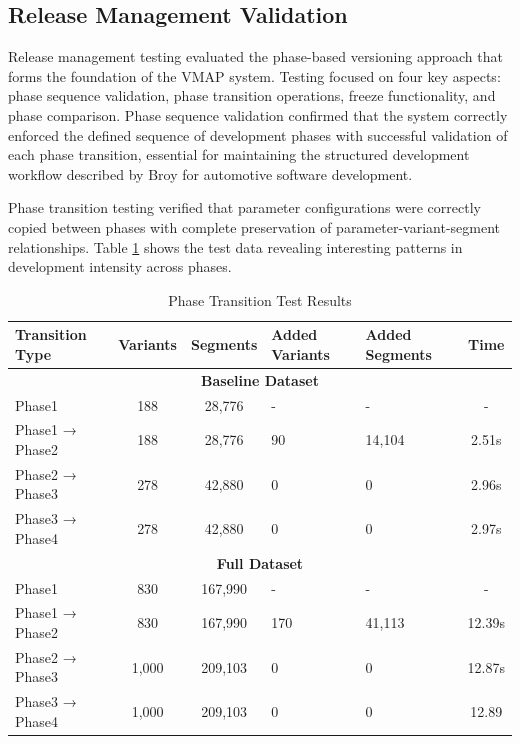 \subsection{Release Management Validation}
\label{subsec:release-management-validation}

Release management testing evaluated the phase-based versioning approach that forms the foundation of the \ac{VMAP} system. Testing focused on four key aspects: phase sequence validation, phase transition operations, freeze functionality, and phase comparison. Phase sequence validation confirmed that the system correctly enforced the defined sequence of development phases with successful validation of each phase transition, essential for maintaining the structured development workflow described by Broy \cite{broy2006challenges} for automotive software development.

Phase transition testing verified that parameter configurations were correctly copied between phases with complete preservation of parameter-variant-segment relationships. Table \ref{tab:phase-transition-results} shows the test data revealing interesting patterns in development intensity across phases.

\begin{table}[h]
\centering
\caption{Phase Transition Test Results}
\label{tab:phase-transition-results}
\begin{tabular}{|l|c|c|p{2cm}|p{2cm}|c|}
\hline
\textbf{Transition Type} & \textbf{Variants} & \textbf{Segments} & \textbf{Added Variants} & \textbf{Added Segments} & \textbf{Time} \\
\hline
\multicolumn{6}{|c|}{\textbf{Baseline Dataset}} \\
\hline
Phase1 & 188 & 28,776 & - & - & - \\
\hline
Phase1 → Phase2 & 188 & 28,776 & 90 & 14,104 & 2.51s \\
\hline
Phase2 → Phase3 & 278 & 42,880 & 0 & 0 & 2.96s \\
\hline
Phase3 → Phase4 & 278 & 42,880 & 0 & 0 & 2.97s \\
\hline
\multicolumn{6}{|c|}{\textbf{Full Dataset}} \\
\hline
Phase1 & 830 & 167,990 & - & - & - \\
\hline
Phase1 → Phase2 & 830 & 167,990 & 170 & 41,113 & 12.39s \\
\hline
Phase2 → Phase3 & 1,000 & 209,103 & 0 & 0 & 12.87s \\
\hline
Phase3 → Phase4 & 1,000 & 209,103 & 0 & 0 & 12.89 \\
\hline
\end{tabular}
\end{table}

